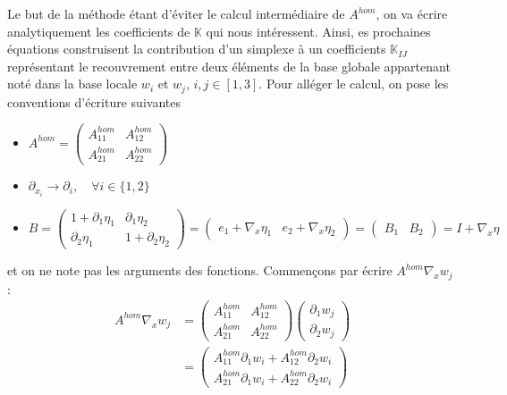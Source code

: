 \documentclass[11pt]{article}
\newcommand{\K}{\mathbb{K}}
\newcommand{\Ah}{A^{hom}}
\begin{document}
Le but de la méthode étant d'éviter le calcul intermédiaire de $\Ah$, on va écrire analytiquement les coefficients de $\K$ qui nous
intéressent. Ainsi, es prochaines équations construisent la contribution d'un simplexe à un coefficients $\K_{IJ}$ représentant le recouvrement entre
deux éléments de la base globale appartenant noté dans la base locale $w_i$ et $w_j$, $i,j\in [1,3]$. Pour alléger le calcul, on pose les conventions
d'écriture suivantes
\begin{itemize}
\item
  $ 
  \Ah = \left(
    \begin{matrix}
      \Ah_{11} & \Ah_{12} \\
      \Ah_{21} & \Ah_{22}
    \end{matrix}
  \right)
  $
\item $ \partial_{x_i} \rightarrow \partial_i, \quad \forall i \in\{1,2\}$  
\item 
  $
  B = \left(
    \begin{matrix}
      1+\partial_1 \eta_1 &   \partial_1 \eta_2 \\
        \partial_2 \eta_1 & 1+\partial_2 \eta_2
    \end{matrix}
  \right)
  = \left(
    \begin{matrix}
      e_1 + \nabla_x \eta_1 & e_2 + \nabla_x \eta_2
    \end{matrix}
  \right)
  = \left(
    \begin{matrix}
      B_1 & B_2
    \end{matrix}
  \right)
  = I + \nabla_x \eta
  $
\end{itemize}
et on ne note pas les arguments des fonctions. Commençons par écrire $\Ah\nabla_x w_j$ :
\begin{equation}
  \begin{aligned}
    \Ah\nabla_x w_j &=
    \left(
      \begin{matrix}
        \Ah_{11} & \Ah_{12} \\
        \Ah_{21} & \Ah_{22}
      \end{matrix}
    \right)
    \left(
      \begin{matrix}
        \partial_1 w_j \\
        \partial_2 w_j
      \end{matrix}
    \right) \\
    &=
    \left(
      \begin{matrix}
        \Ah_{11} \partial_1 w_i + \Ah_{12} \partial_2 w_i \\
        \Ah_{21} \partial_1 w_i + \Ah_{22} \partial_2 w_i 
      \end{matrix}
    \right)
  \end{aligned}
\end{equation}
\end{document}
